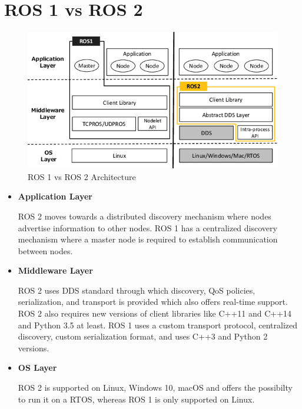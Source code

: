 \documentclass[%
xelatex,
	oneside,		%
	12pt,			%
	parskip=half,	%
	abstracton,
	chapterprefix=true%
    appendixprefix=true]
{scrbook}
\begin{document}
	\section{ROS 1 vs ROS 2}	
	\vspace*{0.5cm}
			\begin{figure}[ht]
\begin{center}
\includegraphics[scale=0.5]{fig/ros1_vs_ros2.jpg}
\caption[ROS 1 vs ROS 2 Architecture]{ROS 1 vs ROS 2 Architecture\cite{rosvsros2}}
\label{fig:rosvsros2}
\end{center}
\end{figure} 

\begin{itemize}
\item {\bfseries Application Layer}


\vspace*{0.5cm}
ROS 2 moves towards a distributed discovery mechanism where nodes advertise information to other nodes. ROS 1 has a centralized discovery mechanism where a master node is required to establish communication between nodes.
\vspace*{0.5cm}
\item {\bfseries Middleware Layer}


\vspace*{0.5cm}
ROS 2 uses DDS standard through which discovery, QoS policies, serialization, and transport is provided which also offers real-time support. ROS 2 also requires new versions of client libraries like C++11 and C++14 and Python 3.5 at least. ROS 1 uses a custom transport protocol, centralized discovery, custom serialization format, and uses C++3 and Python 2 versions.
\vspace*{0.5cm}
\item {\bfseries OS Layer}


\vspace*{0.5cm}
ROS 2 is supported on Linux, Windows 10, macOS and offers the possibilty to run it on a RTOS, whereas ROS 1 is only supported on Linux.
\vspace*{0.5cm}
\end{itemize}
\end{document}
